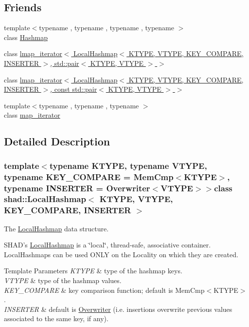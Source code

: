\subsection*{Friends}
\begin{DoxyCompactItemize}
\item 
{\footnotesize template$<$typename , typename , typename , typename $>$ }\\class \hyperlink{classshad_1_1LocalHashmap_a14c7f14e3d86371810686e384b53cbb6}{Hashmap}
\item 
class \hyperlink{classshad_1_1LocalHashmap_a0782f66aa59afb708b15c0ef7782c20d}{lmap\-\_\-iterator$<$ Local\-Hashmap$<$ K\-T\-Y\-P\-E, V\-T\-Y\-P\-E, K\-E\-Y\-\_\-\-C\-O\-M\-P\-A\-R\-E, I\-N\-S\-E\-R\-T\-E\-R $>$, std\-::pair$<$ K\-T\-Y\-P\-E, V\-T\-Y\-P\-E $>$ $>$}
\item 
class \hyperlink{classshad_1_1LocalHashmap_a409d20941abf9e3ce2b3f49f749fe1f7}{lmap\-\_\-iterator$<$ Local\-Hashmap$<$ K\-T\-Y\-P\-E, V\-T\-Y\-P\-E, K\-E\-Y\-\_\-\-C\-O\-M\-P\-A\-R\-E, I\-N\-S\-E\-R\-T\-E\-R $>$, const std\-::pair$<$ K\-T\-Y\-P\-E, V\-T\-Y\-P\-E $>$ $>$}
\item 
{\footnotesize template$<$typename , typename , typename $>$ }\\class \hyperlink{classshad_1_1LocalHashmap_ae4a075e5a8191685a74f2d18b8cd8850}{map\-\_\-iterator}
\end{DoxyCompactItemize}


\subsection{Detailed Description}
\subsubsection*{template$<$typename K\-T\-Y\-P\-E, typename V\-T\-Y\-P\-E, typename K\-E\-Y\-\_\-\-C\-O\-M\-P\-A\-R\-E = Mem\-Cmp$<$\-K\-T\-Y\-P\-E$>$, typename I\-N\-S\-E\-R\-T\-E\-R = Overwriter$<$\-V\-T\-Y\-P\-E$>$$>$class shad\-::\-Local\-Hashmap$<$ K\-T\-Y\-P\-E, V\-T\-Y\-P\-E, K\-E\-Y\-\_\-\-C\-O\-M\-P\-A\-R\-E, I\-N\-S\-E\-R\-T\-E\-R $>$}

The \hyperlink{classshad_1_1LocalHashmap}{Local\-Hashmap} data structure. 

S\-H\-A\-D's \hyperlink{classshad_1_1LocalHashmap}{Local\-Hashmap} is a \char`\"{}local\char`\"{}, thread-\/safe, associative container. Local\-Hashmaps can be used O\-N\-L\-Y on the Locality on which they are created. 
\begin{DoxyTemplParams}{Template Parameters}
{\em K\-T\-Y\-P\-E} & type of the hashmap keys. \\
\hline
{\em V\-T\-Y\-P\-E} & type of the hashmap values. \\
\hline
{\em K\-E\-Y\-\_\-\-C\-O\-M\-P\-A\-R\-E} & key comparison function; default is Mem\-Cmp$<$\-K\-T\-Y\-P\-E$>$. \\
\hline
{\em I\-N\-S\-E\-R\-T\-E\-R} & default is \hyperlink{structshad_1_1Overwriter}{Overwriter} (i.\-e. insertions overwrite previous values associated to the same key, if any). \\
\hline
\end{DoxyTemplParams}



